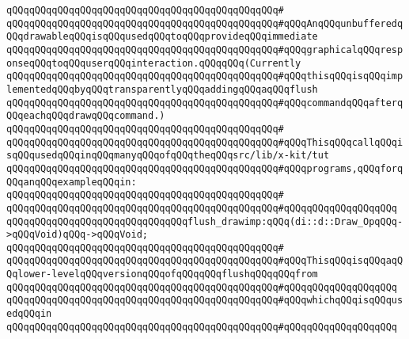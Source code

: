 \verb|qQQqqQQqqQQqqQQqqQQqqQQqqQQqqQQqqQQqqQQqqQQqqQQq#|\newline
\verb|qQQqqQQqqQQqqQQqqQQqqQQqqQQqqQQqqQQqqQQqqQQqqQQq#qQQqAnqQQqunbufferedqQQqdrawableqQQqisqQQqusedqQQqtoqQQqprovideqQQqimmediate|\newline
\verb|qQQqqQQqqQQqqQQqqQQqqQQqqQQqqQQqqQQqqQQqqQQqqQQq#qQQqgraphicalqQQqresponseqQQqtoqQQquserqQQqinteraction.qQQqqQQq(Currently|\newline
\verb|qQQqqQQqqQQqqQQqqQQqqQQqqQQqqQQqqQQqqQQqqQQqqQQq#qQQqthisqQQqisqQQqimplementedqQQqbyqQQqtransparentlyqQQqaddingqQQqaqQQqflush|\newline
\verb|qQQqqQQqqQQqqQQqqQQqqQQqqQQqqQQqqQQqqQQqqQQqqQQq#qQQqcommandqQQqafterqQQqeachqQQqdrawqQQqcommand.)|\newline
\verb|qQQqqQQqqQQqqQQqqQQqqQQqqQQqqQQqqQQqqQQqqQQqqQQq#|\newline
\verb|qQQqqQQqqQQqqQQqqQQqqQQqqQQqqQQqqQQqqQQqqQQqqQQq#qQQqThisqQQqcallqQQqisqQQqusedqQQqinqQQqmanyqQQqofqQQqtheqQQqsrc/lib/x-kit/tut|\newline
\verb|qQQqqQQqqQQqqQQqqQQqqQQqqQQqqQQqqQQqqQQqqQQqqQQq#qQQqprograms,qQQqforqQQqanqQQqexampleqQQqin:|\newline
\verb|qQQqqQQqqQQqqQQqqQQqqQQqqQQqqQQqqQQqqQQqqQQqqQQq#|\newline
\verb|qQQqqQQqqQQqqQQqqQQqqQQqqQQqqQQqqQQqqQQqqQQqqQQq#qQQqqQQqqQQqqQQqqQQq|\newline
\newline
\verb|qQQqqQQqqQQqqQQqqQQqqQQqqQQqqQQqflush_drawimp:qQQq(di::d::Draw_OpqQQq->qQQqVoid)qQQq->qQQqVoid;|\newline
\verb|qQQqqQQqqQQqqQQqqQQqqQQqqQQqqQQqqQQqqQQqqQQqqQQq#|\newline
\verb|qQQqqQQqqQQqqQQqqQQqqQQqqQQqqQQqqQQqqQQqqQQqqQQq#qQQqThisqQQqisqQQqaqQQqlower-levelqQQqversionqQQqofqQQqqQQqflushqQQqqQQqfrom|\newline
\verb|qQQqqQQqqQQqqQQqqQQqqQQqqQQqqQQqqQQqqQQqqQQqqQQq#qQQqqQQqqQQqqQQqqQQq|\newline
\verb|qQQqqQQqqQQqqQQqqQQqqQQqqQQqqQQqqQQqqQQqqQQqqQQq#qQQqwhichqQQqisqQQqusedqQQqin|\newline
\verb|qQQqqQQqqQQqqQQqqQQqqQQqqQQqqQQqqQQqqQQqqQQqqQQq#qQQqqQQqqQQqqQQqqQQq|\newline
